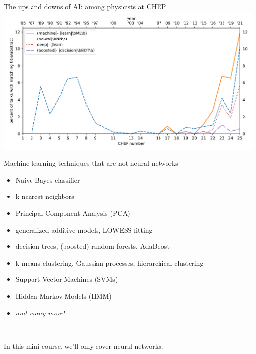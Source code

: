 \documentclass[aspectratio=169]{beamer}
\begin{document}
\begin{frame}{The ups and downs of AI: among physicists at CHEP}
\vspace{0.25 cm}
\includegraphics[width=\linewidth]{img/chep-papers-ml.pdf}
\end{frame}

\begin{frame}{Machine learning techniques that are not neural networks}
\vspace{0.5 cm}
\large

\begin{itemize}
\item Naive Bayes classifier
\item k-nearest neighbors
\item Principal Component Analysis (PCA)
\item generalized additive models, LOWESS fitting
\item decision trees, (boosted) random forests, AdaBoost
\item k-means clustering, Gaussian processes, hierarchical clustering
\item Support Vector Machines (SVMs)
\item Hidden Markov Models (HMM)
\item {\it and many more!}
\end{itemize}

\normalsize
\vspace{0.5 cm}
\end{frame}

\begin{frame}{\mbox{ }}
\begin{center}
\LARGE
In this mini-course, we'll only cover neural networks.

\large
\vspace{1 cm}
\end{center}
\end{frame}
\end{document}
